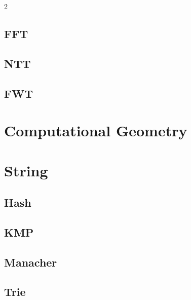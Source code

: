 \documentclass[10pt,a4paper]{article}
\begin{document}
\begin{multicols}{2}


\subsection{FFT}



\subsection{NTT}



\subsection{FWT}



\newpage

\section{Computational Geometry}



\newpage

\section{String}

\subsection{Hash}



\subsection{KMP}



\subsection{Manacher}



\subsection{Trie}


\end{multicols}
\end{document}
